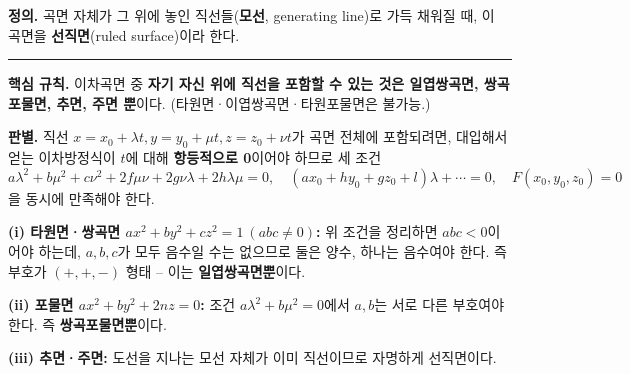 \documentclass{article}
\theoremstyle{mystyle}
\begin{document}
\begin{tcolorbox}[
    colback=teal!4,
    colframe=teal!65!black,
    title=정의 \& 핵심 규칙,
    fonttitle=\bfseries,
    boxrule=0.5mm,
    arc=3mm
    ]
    \textbf{\textcolor{teal!65!black}{정의.}}\quad
    곡면 자체가 그 위에 놓인 직선들(\textbf{모선}, generating line)로 가득 채워질 때, 이 곡면을 \textbf{선직면}(ruled surface)이라 한다.

    \noindent\textcolor{teal!50!black}{\rule{\linewidth}{0.4pt}}

    \textbf{\textcolor{teal!65!black}{핵심 규칙.}}\quad
    이차곡면 중 \textbf{자기 자신 위에 직선을 포함할 수 있는 것은 일엽쌍곡면, 쌍곡포물면, 추면, 주면 뿐}이다. (타원면·이엽쌍곡면·타원포물면은 불가능.)
\end{tcolorbox}

\textbf{판별.} 직선 \(x=x_0+\lambda t,y=y_0+\mu t,z=z_0+\nu t\)가 곡면 전체에 포함되려면, 대입해서 얻는 이차방정식이 \(t\)에 대해 \textbf{항등적으로 0}이어야 하므로 세 조건
\[
a\lambda^2+b\mu^2+c\nu^2+2f\mu\nu+2g\nu\lambda+2h\lambda\mu=0,\quad
(ax_0+hy_0+gz_0+l)\lambda+\cdots=0,\quad F(x_0,y_0,z_0)=0
\]
을 동시에 만족해야 한다.

\textbf{(i) 타원면·쌍곡면 \(ax^2+by^2+cz^2=1\ (abc\ne0)\):} 위 조건을 정리하면 \(abc<0\)이어야 하는데, \(a,b,c\)가 모두 음수일 수는 없으므로 둘은 양수, 하나는 음수여야 한다. 즉 부호가 \((+,+,-)\) 형태 -- 이는 \textbf{일엽쌍곡면뿐}이다.

\textbf{(ii) 포물면 \(ax^2+by^2+2nz=0\):} 조건 \(a\lambda^2+b\mu^2=0\)에서 \(a,b\)는 서로 다른 부호여야 한다. 즉 \textbf{쌍곡포물면뿐}이다.

\textbf{(iii) 추면·주면:} 도선을 지나는 모선 자체가 이미 직선이므로 자명하게 선직면이다.
\end{document}
